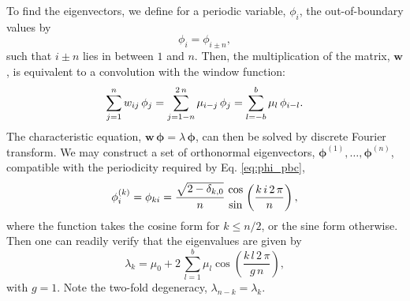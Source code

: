 \documentclass[reprint, superscriptaddress, floatfix]{revtex4-1}
\begin{document}
To find the eigenvectors,
we define for a periodic variable, $\phi_i$,
the out-of-boundary values by
%
\begin{equation}
  \phi_i = \phi_{i \pm n},
\label{eq:phi_pbc}
\end{equation}
%
such that $i \pm n$ lies in between $1$ and $n$.
%
Then, the multiplication of the matrix, $\mathbf w$,
is equivalent to a convolution with the window function:
%
\begin{equation}
  \sum_{ j = 1 }^n
    w_{ij} \, \phi_j
  =
  \sum_{ j = 1 - n }^{ 2 \, n }
    \mu_{i - j} \, \phi_j
  =
  \sum_{ l = -b }^{ b }
    \mu_l \, \phi_{ i - l}
  .
  \notag
\end{equation}
%
The characteristic equation,
$\mathbf w \, \pmb\phi = \lambda \, \pmb\phi$,
can then be solved by discrete Fourier transform.
%
We may construct a set of orthonormal eigenvectors,
$\pmb\phi^{(1)}, \dots, \pmb\phi^{(n)}$,
compatible with the periodicity
required by Eq. \eqref{eq:phi_pbc},
%
\begin{equation}
  \phi^{(k)}_i
  =
  \phi_{ki}
  =
  \frac{ \sqrt{ 2 - \delta_{k,0} } } { n }
  \,
  {\cos \atop \sin}
  \left(
    \frac{ k \, i \, 2 \, \pi }
         {      n             }
  \right)
  ,
  \notag
\end{equation}
%
where the function takes the cosine form for $k \le n/2$,
or the sine form otherwise.
%
Then one can readily verify that the eigenvalues are given by
\begin{equation}
  \lambda_k
  =
  \mu_0
  +
  2 \,
  \sum_{ l = 1 }^b
  \mu_l
  \cos\left(
  \frac{ k \, l \, 2 \, \pi }
       {      g \, n        }
  \right)
  ,
  \label{eq:wband_eigenvalue}
\end{equation}
%
with $g = 1$.
Note the two-fold degeneracy,
  $\lambda_{n - k} = \lambda_k$.
\end{document}
